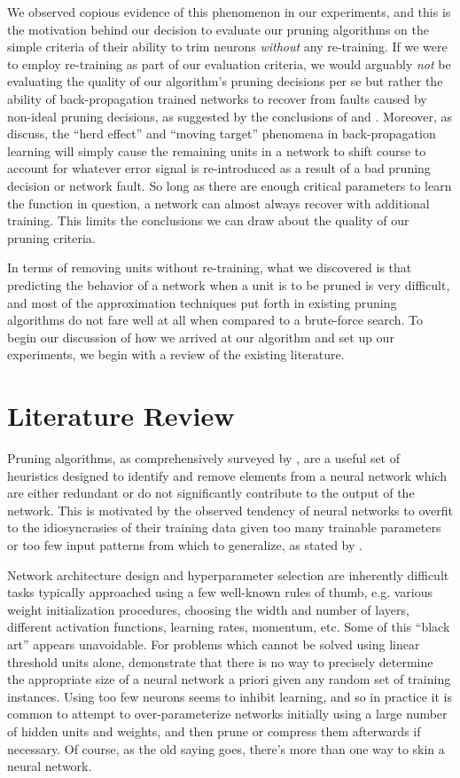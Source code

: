 We observed copious evidence of this phenomenon in our experiments, and this is the motivation behind our decision to evaluate our pruning algorithms on the simple criteria of their ability to trim neurons \textit{without} any re-training. If we were to employ re-training as part of our evaluation criteria, we would arguably \textit{not} be evaluating the quality of our algorithm's pruning decisions per se but rather the ability of back-propagation trained networks to recover from faults caused by non-ideal pruning decisions, as suggested by the conclusions of \cite{segee1991fault} and \cite{mozer1989skeletonization}. Moreover, as \cite{fahlman1989cascade} discuss, the ``herd effect'' and ``moving target'' phenomena in back-propagation learning will simply cause the remaining units in a network to shift course to account for whatever error signal is re-introduced as a result of a bad pruning decision or network fault. So long as there are enough critical parameters to learn the function in question, a network can almost always recover with additional training. This limits the conclusions we can draw about the quality of our pruning criteria. 

In terms of removing units without re-training, what we discovered is that predicting the behavior of a network when a unit is to be pruned is very difficult, and most of the approximation techniques put forth in existing pruning algorithms do not fare well at all when compared to a brute-force search. To begin our discussion of how we arrived at our algorithm and set up our experiments, we begin with a review of the existing literature.

\section{Literature Review}
Pruning algorithms, as comprehensively surveyed by \cite{reed1993pruning}, are a useful set of heuristics designed to identify and remove elements from a neural network which are either redundant or do not significantly contribute to the output of the network. This is motivated by the observed tendency of neural networks to overfit to the idiosyncrasies of their training data given too many trainable parameters or too few input patterns from which to generalize, as stated by \cite{chauvin1990generalization}. 

Network architecture design and hyperparameter selection are inherently difficult tasks typically approached using a few well-known rules of thumb, e.g. various weight initialization procedures, choosing the width and number of layers, different activation functions, learning rates, momentum, etc. Some of this ``black art'' appears unavoidable. For problems which cannot be solved using linear threshold units alone, \cite{baum1989size} demonstrate that there is no way to precisely determine the appropriate size of a neural network a priori given any random set of training instances. Using too few neurons seems to inhibit learning, and so in practice it is common to attempt to over-parameterize networks initially using a large number of hidden units and weights, and then prune or compress them afterwards if necessary. Of course, as the old saying goes, there's more than one way to skin a neural network. 

